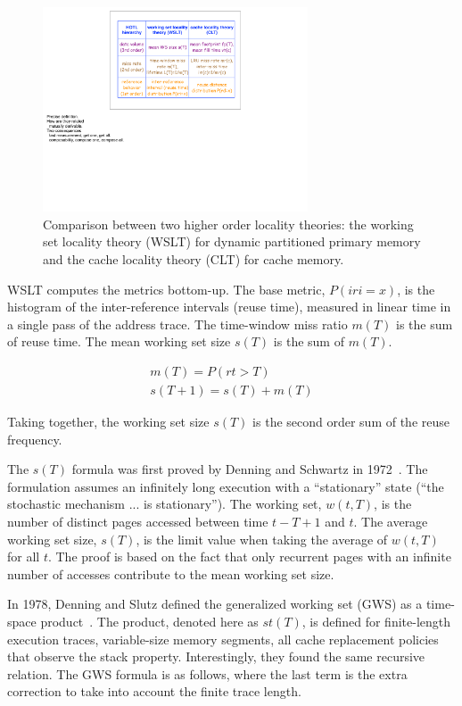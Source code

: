 \begin{figure}[h!]
\centering
\includegraphics[width=0.7\textwidth]{figures/model/hotl}
\caption{Comparison between two higher order locality theories: the
  working set locality theory (WSLT) for dynamic partitioned primary
  memory and the cache locality theory (CLT) for cache memory.}
\label{fig:hotl}
\end{figure}

\noindent WSLT computes the metrics bottom-up.  The base metric,
$P(iri=x)$, is the histogram of the
inter-reference intervals (reuse time), measured in linear time in a
single pass of the address trace.  The time-window miss ratio $m(T)$ 
is the sum of reuse time.  The mean working set size $s(T)$ is
the sum of $m(T)$. 

\begin{align*}
m(T) = P(rt>T)\\
s(T+1) = s(T) + m(T)
\end{align*}

\noindent Taking together, the working set size $s(T)$ is the second
order sum of the reuse frequency.  

The $s(T)$ formula was first proved by Denning and Schwartz in
1972~\cite{DenningS:CACM72}.  The formulation assumes an infinitely
long execution with a ``stationary'' state (``the stochastic mechanism
... is stationary'').  The working set, $w(t,T)$, is the number of
distinct pages accessed between time $t-T+1$ and $t$.  The average
working set size, $s(T)$, is the limit value when taking the average
of $w(t,T)$ for all $t$.  The proof is based on the fact that only
recurrent pages with an infinite number of accesses contribute to the
mean working set size.

In 1978, Denning and Slutz defined the generalized working set (GWS)
as a time-space product~\cite{DenningS:CACM78}.  The product, denoted
here as $st(T)$, is defined for finite-length execution traces,
variable-size memory segments, all cache replacement policies that
observe the stack property.  Interestingly, they found the same
recursive relation.  The GWS formula is as follows, where the last
term is the extra correction to take into account the finite trace length.

